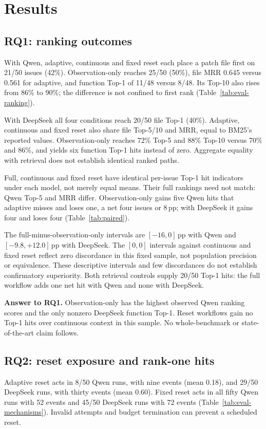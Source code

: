 \section{Results}\label{sec:results}
\subsection{RQ1: ranking outcomes}\label{sec:rq1}\label{sec:coverage}
With Qwen, adaptive, continuous and fixed reset each place a patch file first on 21/50 issues (42\%). Observation-only reaches 25/50 (50\%), file MRR 0.645 versus 0.561 for adaptive, and function Top-1 of 11/48 versus 8/48. Its Top-10 also rises from 86\% to 90\%; the difference is not confined to first rank (Table~\ref{tab:eval-ranking}).


With DeepSeek all four conditions reach 20/50 file Top-1 (40\%). Adaptive, continuous and fixed reset also share file Top-5/10 and MRR, equal to BM25's reported values. Observation-only reaches 72\% Top-5 and 88\% Top-10 versus 70\% and 86\%, and yields six function Top-1 hits instead of zero. Aggregate equality with retrieval does not establish identical ranked paths.

Full, continuous and fixed reset have identical per-issue Top-1 hit indicators under each model, not merely equal means. Their full rankings need not match: Qwen Top-5 and MRR differ. Observation-only gains five Qwen hits that adaptive misses and loses one, a net four issues or 8\,pp; with DeepSeek it gains four and loses four (Table~\ref{tab:paired}).


The full-minus-observation-only intervals are $[-16,0]$\,pp with Qwen and $[-9.8,+12.0]$\,pp with DeepSeek. The $[0,0]$ intervals against continuous and fixed reset reflect zero discordance in this fixed sample, not population precision or equivalence. These descriptive intervals and few discordances do not establish confirmatory superiority. Both retrieval controls supply 20/50 Top-1 hits: the full workflow adds one net hit with Qwen and none with DeepSeek.

\noindent\textbf{Answer to RQ1.} Observation-only has the highest observed Qwen ranking scores and the only nonzero DeepSeek function Top-1. Reset workflows gain no Top-1 hits over continuous context in this sample. No whole-benchmark or state-of-the-art claim follows.

\subsection{RQ2: reset exposure and rank-one hits}\label{sec:rq2}
Adaptive reset acts in 8/50 Qwen runs, with nine events (mean 0.18), and 29/50 DeepSeek runs, with thirty events (mean 0.60). Fixed reset acts in all fifty Qwen runs with 52 events and 45/50 DeepSeek runs with 72 events (Table~\ref{tab:eval-mechanisms}). Invalid attempts and budget termination can prevent a scheduled reset.


